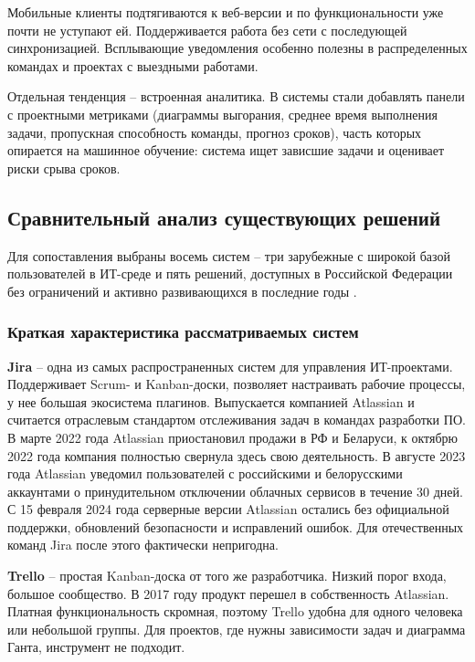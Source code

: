 Мобильные клиенты подтягиваются к веб-версии и по функциональности уже почти не уступают ей. Поддерживается работа без сети с последующей синхронизацией. Всплывающие уведомления особенно полезны в распределенных командах и проектах с выездными работами.

Отдельная тенденция -- встроенная аналитика. В системы стали добавлять панели с проектными метриками (диаграммы выгорания, среднее время выполнения задачи, пропускная способность команды, прогноз сроков), часть которых опирается на машинное обучение: система ищет зависшие задачи и оценивает риски срыва сроков.

\subsection{Сравнительный анализ существующих решений}

Для сопоставления выбраны восемь систем -- три зарубежные с широкой базой пользователей в ИТ-среде и пять решений, доступных в Российской Федерации без ограничений и активно развивающихся в последние годы \cite{yougile_review}.

\subsubsection{Краткая характеристика рассматриваемых систем}

\textbf{Jira} -- одна из самых распространенных систем для управления ИТ-проектами. Поддерживает Scrum- и Kanban-доски, позволяет настраивать рабочие процессы, у нее большая экосистема плагинов. Выпускается компанией Atlassian и считается отраслевым стандартом отслеживания задач в командах разработки ПО. В марте 2022 года Atlassian приостановил продажи в РФ и Беларуси, к октябрю 2022 года компания полностью свернула здесь свою деятельность. В августе 2023 года Atlassian уведомил пользователей с российскими и белорусскими аккаунтами о принудительном отключении облачных сервисов в течение 30 дней. С 15 февраля 2024 года серверные версии Atlassian остались без официальной поддержки, обновлений безопасности и исправлений ошибок. Для отечественных команд Jira после этого фактически непригодна.

\textbf{Trello} -- простая Kanban-доска от того же разработчика. Низкий порог входа, большое сообщество. В 2017 году продукт перешел в собственность Atlassian. Платная функциональность скромная, поэтому Trello удобна для одного человека или небольшой группы. Для проектов, где нужны зависимости задач и диаграмма Ганта, инструмент не подходит.

